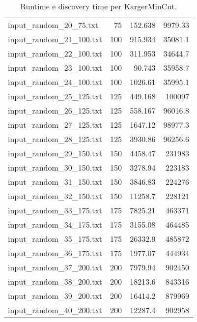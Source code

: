 \begin{table}[H]
\begin{tabular}{lrrr}
     input\_random\_20\_75.txt  &      75 &          152.638 &       9979.33  \\
     input\_random\_21\_100.txt &     100 &          915.934 &      35081.1   \\
     input\_random\_22\_100.txt &     100 &          311.953 &      34644.7   \\
     input\_random\_23\_100.txt &     100 &           90.743 &      35958.7   \\
     input\_random\_24\_100.txt &     100 &         1026.61  &      35995.1   \\
     input\_random\_25\_125.txt &     125 &          449.168 &     100097     \\
     input\_random\_26\_125.txt &     125 &          558.167 &      96016.8   \\
     input\_random\_27\_125.txt &     125 &         1647.12  &      98977.3   \\
     input\_random\_28\_125.txt &     125 &         3930.86  &      96256.6   \\
     input\_random\_29\_150.txt &     150 &         4458.47  &     231983     \\
     input\_random\_30\_150.txt &     150 &         3278.94  &     223183     \\
     input\_random\_31\_150.txt &     150 &         3846.83  &     224276     \\
     input\_random\_32\_150.txt &     150 &        11258.7   &     228121     \\
     input\_random\_33\_175.txt &     175 &         7825.21  &     463371     \\
     input\_random\_34\_175.txt &     175 &         3155.08  &     464485     \\
     input\_random\_35\_175.txt &     175 &        26332.9   &     485872     \\
     input\_random\_36\_175.txt &     175 &         1977.07  &     444934     \\
     input\_random\_37\_200.txt &     200 &         7979.94  &     902450     \\
     input\_random\_38\_200.txt &     200 &        18213.6   &     843316     \\
     input\_random\_39\_200.txt &     200 &        16414.2   &     879969     \\
     input\_random\_40\_200.txt &     200 &        12287.4   &     902958     \\
     \hline
    \end{tabular}

    \caption{Runtime e discovery time per KargerMinCut.}
    \label{table:karger-running-time}
\end{table}

